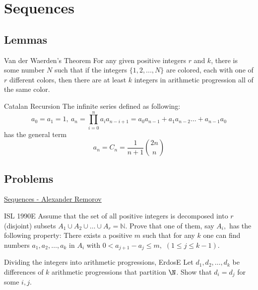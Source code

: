\newpage\section{Sequences}


\subsection{Lemmas}

{Van der Waerden's Theorem}{
    For any given positive integers $r$ and $k$, there is some number $ N $ such
    that if the integers $ \{1, 2, ..., N\} $ are colored, each with one of $ r $
    different colors, then there are at least $ k $ integers in arithmetic
    progression all of the same color.
}

\theo{}
{Catalan Recursion}{
    The infinite series defined as following: \[ a_0 = a_1 = 1,\ a_n =
    \prod_{i=0}^{n} a_ia_{n-i+1} = a_0a_{n-1} + a_1a_{n-2}\dots + a_{n-1}a_0 \]
    has the general term 
    \[a_n = C_n = \boxed{\frac{1}{n+1} \binom{2n}{n}}\] 
}



\subsection{Problems}


\begin{myitemize}
    \item \href{http://alexanderrem.weebly.com/uploads/7/2/5/6/72566533/sequences.pdf}{Sequences - Alexander Remorov}
\end{myitemize}

{ISL 1990}{E}{
    Assume that the set of all positive integers is decomposed into $ r $
    (disjoint) subsets $ A_1 \cup A_2 \cup \dots \cup A_r = \mathbb{N}. $
    Prove that one of them, say $ A_i, $ has the following property: There
    exists a positive $ m $ such that for any $ k $ one can find numbers $
    a_1, a_2, \ldots, a_k $ in $ A_i $ with $ 0 < a_{j+1} - a_j \leq m, $  $
    (1 \leq j \leq k-1)$.
}


{Dividing the integers into arithmetic progressions, Erdos}{E}{
    Let $ d_1, d_2,\dots, d_k $ be differences of $ k $ arithmetic
    progressions that partition $ \N $. Show that $ d_i=d_j $ for some $i,j$.
}


